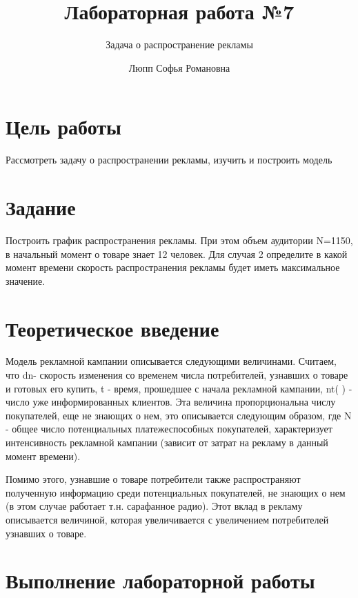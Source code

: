 \documentclass[
  english,
  russian,
  12pt,
  a4paper,
  DIV=11,
  numbers=noendperiod]{scrreprt}
\title{Лабораторная работа №7}
\subtitle{Задача о распространение рекламы}
\author{Люпп Софья Романовна}
\date{}
\renewcommand*\contentsname{Содержание}
\newcommand\contentsname{Содержание}
\begin{document}
\maketitle

\renewcommand*\contentsname{Содержание}
{
\setcounter{tocdepth}{1}
\tableofcontents
}
\listoffigures
\listoftables

\chapter{Цель
работы}\label{ux446ux435ux43bux44c-ux440ux430ux431ux43eux442ux44b}

Рассмотреть задачу о распространении рекламы, изучить и построить модель

\chapter{Задание}\label{ux437ux430ux434ux430ux43dux438ux435}

Построить график распространения рекламы. При этом объем аудитории
N=1150, в начальный момент о товаре знает 12 человек. Для случая 2
определите в какой момент времени скорость распространения рекламы будет
иметь максимальное значение.

\chapter{Теоретическое
введение}\label{ux442ux435ux43eux440ux435ux442ux438ux447ux435ux441ux43aux43eux435-ux432ux432ux435ux434ux435ux43dux438ux435}

Модель рекламной кампании описывается следующими величинами. Считаем,
что dn\dt - скорость изменения со временем числа потребителей, узнавших
о товаре и готовых его купить, t - время, прошедшее с начала рекламной
кампании, nt( ) - число уже информированных клиентов. Эта величина
пропорциональна числу покупателей, еще не знающих о нем, это описывается
следующим образом, где N - общее число потенциальных платежеспособных
покупателей, характеризует интенсивность рекламной кампании (зависит от
затрат на рекламу в данный момент времени).

Помимо этого, узнавшие о товаре потребители также распространяют
полученную информацию среди потенциальных покупателей, не знающих о нем
(в этом случае работает т.н. сарафанное радио). Этот вклад в рекламу
описывается величиной, которая увеличивается с увеличением потребителей
узнавших о товаре.

\chapter{Выполнение лабораторной
работы}\label{ux432ux44bux43fux43eux43bux43dux435ux43dux438ux435-ux43bux430ux431ux43eux440ux430ux442ux43eux440ux43dux43eux439-ux440ux430ux431ux43eux442ux44b}
\end{document}
